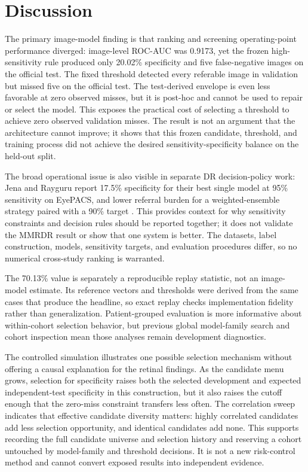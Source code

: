 \documentclass{ieeeaccess}
\begin{document}
\section{Discussion}
The primary image-model finding is that ranking and screening operating-point performance diverged: image-level ROC-AUC was 0.9173, yet the frozen high-sensitivity rule produced only 20.02\% specificity and five false-negative images on the official test. The fixed threshold detected every referable image in validation but missed five on the official test. The test-derived envelope is even less favorable at zero observed misses, but it is post-hoc and cannot be used to repair or select the model. This exposes the practical cost of selecting a threshold to achieve zero observed validation misses. The result is not an argument that the architecture cannot improve; it shows that this frozen candidate, threshold, and training process did not achieve the desired sensitivity-specificity balance on the held-out split.

The broad operational issue is also visible in separate DR decision-policy work: Jena and Rayguru report 17.5\% specificity for their best single model at 95\% sensitivity on EyePACS, and lower referral burden for a weighted-ensemble strategy paired with a 90\% target \cite{jena2026}. This provides context for why sensitivity constraints and decision rules should be reported together; it does not validate the MMRDR result or show that one system is better. The datasets, label construction, models, sensitivity targets, and evaluation procedures differ, so no numerical cross-study ranking is warranted.

The 70.13\% value is separately a reproducible replay statistic, not an image-model estimate. Its reference vectors and thresholds were derived from the same cases that produce the headline, so exact replay checks implementation fidelity rather than generalization. Patient-grouped evaluation is more informative about within-cohort selection behavior, but previous global model-family search and cohort inspection mean those analyses remain development diagnostics.

The controlled simulation illustrates one possible selection mechanism without offering a causal explanation for the retinal findings. As the candidate menu grows, selection for specificity raises both the selected development and expected independent-test specificity in this construction, but it also raises the cutoff enough that the zero-miss constraint transfers less often. The correlation sweep indicates that effective candidate diversity matters: highly correlated candidates add less selection opportunity, and identical candidates add none. This supports recording the full candidate universe and selection history and reserving a cohort untouched by model-family and threshold decisions. It is not a new risk-control method and cannot convert exposed results into independent evidence.
\end{document}
